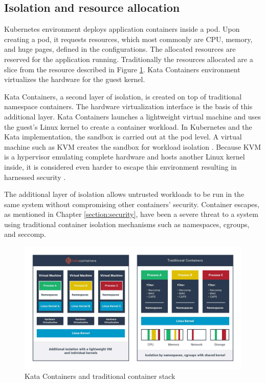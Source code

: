 \subsection{Isolation and resource allocation}

Kubernetes environment deploys application containers inside a pod. Upon creating a pod, it requests resources, which most commonly are CPU, memory, and huge pages, defined in the configurations. The allocated resources are reserved for the application running. Traditionally the resources allocated are a slice from the resource described in Figure \ref{fig:KataContainersStack}. Kata Containers environment virtualizes the hardware for the guest kernel.

Kata Containers, a second layer of isolation, is created on top of traditional namespace containers. The hardware virtualization interface is the basis of this additional layer. Kata Containers launches a lightweight virtual machine and uses the guest's Linux kernel to create a container workload. In Kubernetes and the Kata implementation, the sandbox is carried out at the pod level. A virtual machine such as KVM creates the sandbox for workload isolation \cite{KataContainersVirtualization}. Because KVM is a hypervisor emulating complete hardware and hosts another Linux kernel inside, it is considered even harder to escape this environment resulting in harnessed security \cite{Eder2016}.

The additional layer of isolation allows untrusted workloads to be run in the same system without compromising other containers' security. Container escapes, as mentioned in Chapter \ref{section:security}, have been a severe threat to a system using traditional container isolation mechanisms such as namespaces, cgroups, and seccomp.

\begin{figure}[ht]
  \begin{center}
    \includegraphics[width=13.5cm]{images/KataContainersStack.jpg}
    \caption{Kata Containers and traditional container stack \cite{KataContainers}}
    \label{fig:KataContainersStack}
  \end{center}
\end{figure} 

